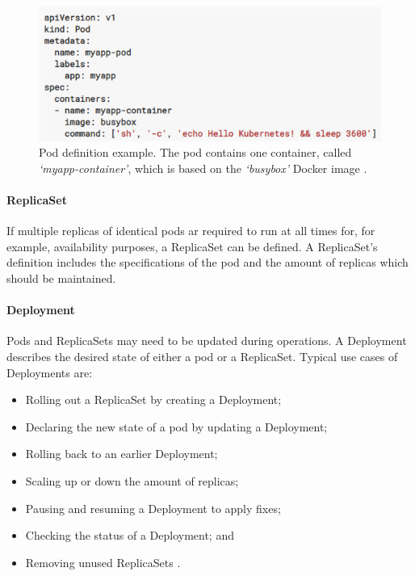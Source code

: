 \begin{figure}[h]
\begin{center}
\includegraphics[width=0.90 \textwidth]{Images/Pod_example.PNG}
\end{center}
\captionsetup{justification=centering}
\caption{Pod definition example. The pod contains one container, called \textit{`myapp-container'}, which is based on the \textit{`busybox'} Docker image \citep{Kubernetes-Pod}.}
\label{fig:pod}
\end{figure}

\paragraph{ReplicaSet}
If multiple replicas of identical pods ar required to run at all times for, for example, availability purposes, a ReplicaSet can be defined. A ReplicaSet's definition includes the specifications of the pod and the amount of replicas which should be maintained\citep{Kubernetes-ReplicaSet}.

\paragraph{Deployment}
Pods and ReplicaSets may need to be updated during operations. A Deployment describes the desired state of either a pod or a ReplicaSet. Typical use cases of Deployments are:
\begin{itemize}
    \item Rolling out a ReplicaSet by creating a Deployment;
    \item Declaring the new state of a pod by updating a Deployment;
    \item Rolling back to an earlier Deployment;
    \item Scaling up or down the amount of replicas;
    \item Pausing and resuming a Deployment to apply fixes;
    \item Checking the status of a Deployment; and
    \item Removing unused ReplicaSets \citep{Kubernetes-Deployment}.
\end{itemize}

